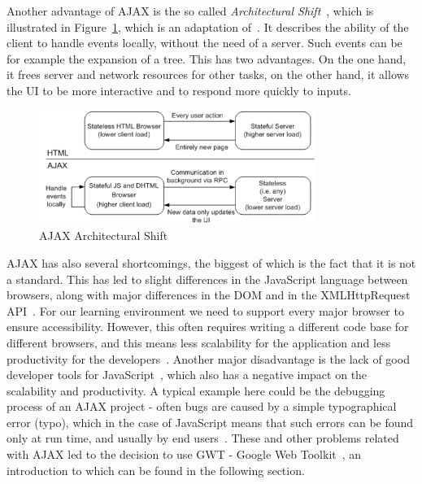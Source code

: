 Another advantage of AJAX is the so called \textit{Architectural Shift}~\cite{wgdd1}, 
which is illustrated in Figure~\ref{fig:ajax02}, which is
an adaptation of~\cite[Figure 3]{wgdd1}. 
It describes the ability of the client to handle events
locally, without the need of a server. Such events can be for example the
expansion of a tree. This has two advantages. On the one hand, it frees server 
and network resources for other tasks, on the other hand, it allows
the UI to be more interactive and to respond more quickly to inputs.

\begin{figure}[h]
	\begin{center}
		\includegraphics[width=0.8\textwidth]{./img/ajax02a.png}
		\caption{AJAX Architectural Shift}
		\label{fig:ajax02}
	\end{center}
\end{figure}

AJAX has also several shortcomings,
the biggest of which is the fact that it is not a standard. This has led to slight 
differences in the JavaScript language between browsers, along with major differences 
in the DOM and in the XMLHttpRequest API~\cite{bgwt1, bgwt2, bgwt3}. 
For our learning environment we need to support every major browser to ensure accessibility. 
However, this often requires writing a different code base for different browsers,
and this means less scalability for the application and less productivity 
for the developers~\cite{bgwt2}. Another major
disadvantage is the lack of good developer tools for JavaScript~\cite{bgwt2}, which also 
has a negative impact on the scalability and productivity.
A typical example here could be the debugging process of an AJAX project - 
often bugs are caused by a simple typographical error (typo), which in the case 
of JavaScript means that such errors can be found only at run time, and usually 
by end users~\cite{wgdd1}. 
These and other problems related with AJAX
led to the decision to use GWT - Google Web Toolkit~\cite{wgwt}, an introduction 
to which can be found in the following section.

